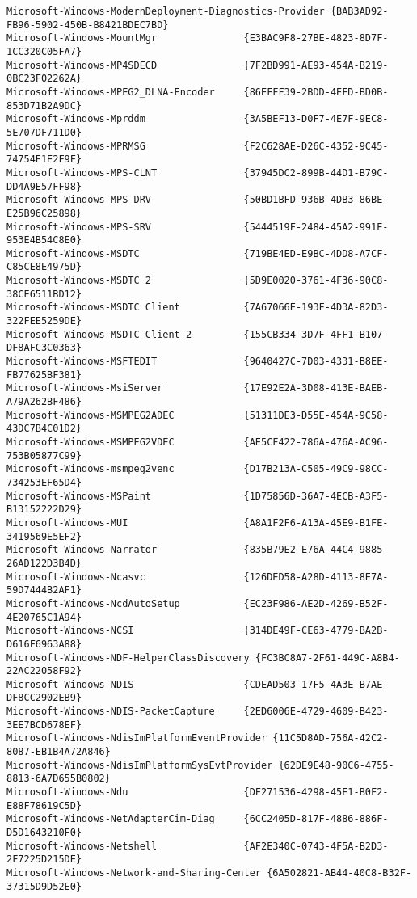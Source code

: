 \documentclass{report}
\begin{document}
\begin{lstlisting}[breaklines=true,basicstyle=\tiny]
Microsoft-Windows-ModernDeployment-Diagnostics-Provider {BAB3AD92-FB96-5902-450B-B8421BDEC7BD}
Microsoft-Windows-MountMgr               {E3BAC9F8-27BE-4823-8D7F-1CC320C05FA7}
Microsoft-Windows-MP4SDECD               {7F2BD991-AE93-454A-B219-0BC23F02262A}
Microsoft-Windows-MPEG2_DLNA-Encoder     {86EFFF39-2BDD-4EFD-BD0B-853D71B2A9DC}
Microsoft-Windows-Mprddm                 {3A5BEF13-D0F7-4E7F-9EC8-5E707DF711D0}
Microsoft-Windows-MPRMSG                 {F2C628AE-D26C-4352-9C45-74754E1E2F9F}
Microsoft-Windows-MPS-CLNT               {37945DC2-899B-44D1-B79C-DD4A9E57FF98}
Microsoft-Windows-MPS-DRV                {50BD1BFD-936B-4DB3-86BE-E25B96C25898}
Microsoft-Windows-MPS-SRV                {5444519F-2484-45A2-991E-953E4B54C8E0}
Microsoft-Windows-MSDTC                  {719BE4ED-E9BC-4DD8-A7CF-C85CE8E4975D}
Microsoft-Windows-MSDTC 2                {5D9E0020-3761-4F36-90C8-38CE6511BD12}
Microsoft-Windows-MSDTC Client           {7A67066E-193F-4D3A-82D3-322FEE5259DE}
Microsoft-Windows-MSDTC Client 2         {155CB334-3D7F-4FF1-B107-DF8AFC3C0363}
Microsoft-Windows-MSFTEDIT               {9640427C-7D03-4331-B8EE-FB77625BF381}
Microsoft-Windows-MsiServer              {17E92E2A-3D08-413E-BAEB-A79A262BF486}
Microsoft-Windows-MSMPEG2ADEC            {51311DE3-D55E-454A-9C58-43DC7B4C01D2}
Microsoft-Windows-MSMPEG2VDEC            {AE5CF422-786A-476A-AC96-753B05877C99}
Microsoft-Windows-msmpeg2venc            {D17B213A-C505-49C9-98CC-734253EF65D4}
Microsoft-Windows-MSPaint                {1D75856D-36A7-4ECB-A3F5-B13152222D29}
Microsoft-Windows-MUI                    {A8A1F2F6-A13A-45E9-B1FE-3419569E5EF2}
Microsoft-Windows-Narrator               {835B79E2-E76A-44C4-9885-26AD122D3B4D}
Microsoft-Windows-Ncasvc                 {126DED58-A28D-4113-8E7A-59D7444B2AF1}
Microsoft-Windows-NcdAutoSetup           {EC23F986-AE2D-4269-B52F-4E20765C1A94}
Microsoft-Windows-NCSI                   {314DE49F-CE63-4779-BA2B-D616F6963A88}
Microsoft-Windows-NDF-HelperClassDiscovery {FC3BC8A7-2F61-449C-A8B4-22AC22058F92}
Microsoft-Windows-NDIS                   {CDEAD503-17F5-4A3E-B7AE-DF8CC2902EB9}
Microsoft-Windows-NDIS-PacketCapture     {2ED6006E-4729-4609-B423-3EE7BCD678EF}
Microsoft-Windows-NdisImPlatformEventProvider {11C5D8AD-756A-42C2-8087-EB1B4A72A846}
Microsoft-Windows-NdisImPlatformSysEvtProvider {62DE9E48-90C6-4755-8813-6A7D655B0802}
Microsoft-Windows-Ndu                    {DF271536-4298-45E1-B0F2-E88F78619C5D}
Microsoft-Windows-NetAdapterCim-Diag     {6CC2405D-817F-4886-886F-D5D1643210F0}
Microsoft-Windows-Netshell               {AF2E340C-0743-4F5A-B2D3-2F7225D215DE}
Microsoft-Windows-Network-and-Sharing-Center {6A502821-AB44-40C8-B32F-37315D9D52E0}

\end{lstlisting}
\end{document}
